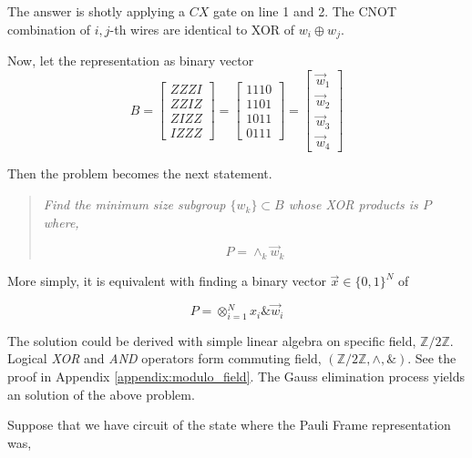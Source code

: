 \documentclass[a4paper,12pt]{article}
\begin{document}
The answer is shotly applying a $CX$ gate on line 1 and 2.
The CNOT combination of $i, j$-th wires are identical to XOR of $w_i \oplus w_j$.

Now, let the representation as binary vector
\begin{equation}
B = \begin{bmatrix}
    ZZZI\\
    ZZIZ\\
    ZIZZ\\
    IZZZ
\end{bmatrix} = \begin{bmatrix}
    1110\\
    1101\\
    1011\\
    0111
\end{bmatrix} = 
\begin{bmatrix}
    \vec{w}_1\\
    \vec{w}_2\\
    \vec{w}_3\\
    \vec{w}_4
\end{bmatrix}
\end{equation}

Then the problem becomes the next statement.

\begin{quotation}
    \textit{Find the minimum size subgroup $\{w_k\} \subset B$ whose XOR products is $P$
    where, }

    \begin{equation}
        P = \wedge_{k} \vec{w}_k 
    \end{equation}

\end{quotation}

More simply, it is equivalent with finding a binary vector $\vec{x} \in \{0, 1\}^N$ of 

\begin{equation}
    P = \otimes_{i=1}^N x_i \& \vec{w}_i
\end{equation}

The solution could be derived with simple linear algebra on specific field, $\mathbb{Z}/2\mathbb{Z}$.
Logical \textit{XOR} and \textit{AND} operators form commuting field, $(\mathbb{Z}/2\mathbb{Z} ,\wedge , \&)$.
See the proof in Appendix \ref{appendix:modulo_field}. 
The Gauss elimination process yields an solution of the above problem.

Suppose that we have circuit of the state where the Pauli Frame representation was,
\end{document}
